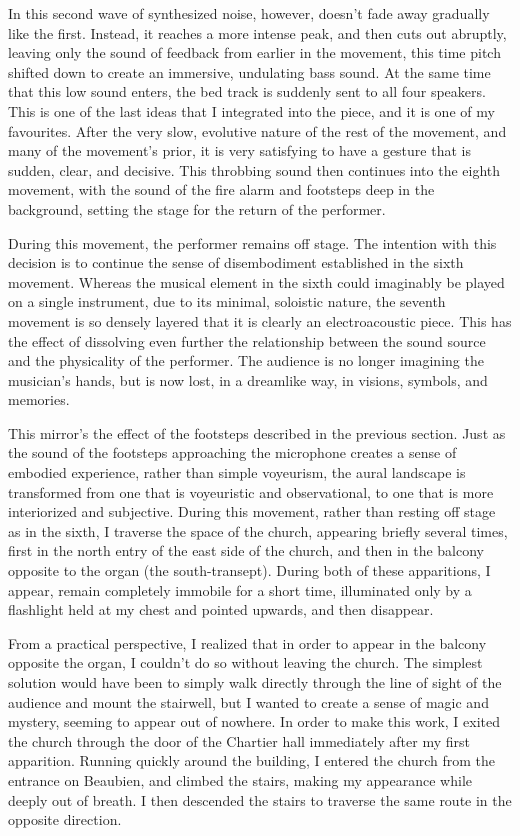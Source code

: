 \documentclass[12pt,twoside,maitrise]{dms_ks}
\theoremstyle{definition}
\begin{document}
In this second wave of synthesized  noise, however, doesn't fade away gradually like the first. 
Instead, it reaches a more intense peak, and then cuts out abruptly, leaving only the sound of feedback from earlier in the movement, this time pitch shifted down to create an immersive, undulating bass sound. 
At the same time that this low sound enters, the bed track is suddenly sent to all four speakers. 
This is one of the last ideas that I integrated into the piece, and it is one of my favourites. 
After the very slow, evolutive nature of the rest of the movement, and many of the movement's prior, it is very satisfying to have a gesture that is sudden, clear, and decisive. 
This throbbing sound then continues into the eighth movement, with the sound of the fire alarm and footsteps deep in the background, setting the stage for the return of the performer.

During this movement, the performer remains off stage. 
The intention with this decision is to continue the sense of disembodiment established in the sixth movement. 
Whereas the musical element in the sixth could imaginably be played on a single instrument, due to its minimal, soloistic nature, the seventh movement is so densely layered that it is clearly an electroacoustic piece. 
This has the effect of dissolving even further the relationship between the sound source and the physicality of the performer. 
The audience is no longer imagining the musician’s hands, but is now lost, in a dreamlike way, in visions, symbols, and memories. 

This mirror’s the effect of the footsteps described in the previous section. 
Just as the sound of the footsteps approaching the microphone creates a sense of embodied experience, rather than simple voyeurism, the aural landscape is transformed from one that is voyeuristic and observational, to one that is more interiorized and subjective. 
During this movement, rather than resting off stage as in the sixth, I traverse the space of the church, appearing briefly several times, first in the north entry of the east side of the church, and then in the balcony opposite to the organ (the south-transept). 
During both of these apparitions, I appear, remain completely immobile for a short time, illuminated only by a flashlight held at my chest and pointed upwards, and then disappear.

From a practical perspective, I realized that in order to appear in the balcony opposite the organ, I couldn't do so without leaving the church. 
The simplest solution would have been to simply walk directly through the line of sight of the audience and mount the stairwell, but I wanted to create a sense of magic and mystery, seeming to appear out of nowhere. 
In order to make this work, I exited the church through the door of the Chartier hall immediately after my first apparition. 
Running quickly around the building, I entered the church from the entrance on Beaubien, and climbed the stairs, making my appearance while deeply out of breath. 
I then descended the stairs to traverse the same route in the opposite direction.
\end{document}
